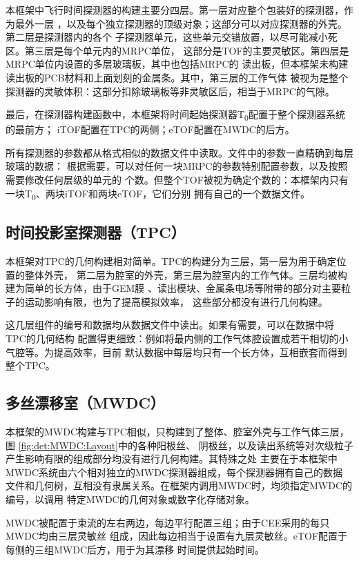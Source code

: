 \documentclass[bachelor,openany,oneside,color]{buaathesis}
\def\TZ{T\textsubscript{0}}
\begin{document}
本框架中飞行时间探测器的构建主要分四层。第一层对应整个包装好的探测器，作为最外一层
，以及每个独立探测器的顶级对象；这部分可以对应探测器的外壳。第二层是探测器内的各个
子探测器单元，这些单元交错放置，以尽可能减小死区。第三层是每个单元内的MRPC单位，
这部分是TOF的主要灵敏区。第四层是MRPC单位内设置的多层玻璃板，其中也包括MRPC的
读出板，但本框架未构建读出板的PCB材料和上面划刻的金属条。其中，第三层的工作气体
被视为是整个探测器的灵敏体积：这部分扣除玻璃板等非灵敏区后，相当于MRPC的气隙。

最后，在探测器构建函数中，本框架将时间起始探测器\TZ 配置于整个探测器系统的最前方；
iTOF配置在TPC的两侧；eTOF配置在MWDC的后方。

所有探测器的参数都从格式相似的数据文件中读取。文件中的参数一直精确到每层玻璃的数据：
根据需要，可以对任何一块MRPC的参数特别配置参数，以及按照需要修改任何层级的单元的
个数。但整个TOF被视为确定个数的：本框架内只有一块\TZ、两块iTOF和两块eTOF，它们分别
拥有自己的一个数据文件。

\subsection{时间投影室探测器（TPC）}

本框架对TPC的几何构建相对简单。TPC的构建分为三层，第一层为用于确定位置的整体外壳，
第二层为腔室的外壳，第三层为腔室内的工作气体。三层均被构建为简单的长方体，由于GEM膜
、读出模块、金属条电场等附带的部分对主要粒子的运动影响有限，也为了提高模拟效率，
这些部分都没有进行几何构建。

这几层组件的编号和数据均从数据文件中读出。如果有需要，可以在数据中将TPC的几何结构
配置得更细致：例如将最内侧的工作气体腔设置成若干相切的小气腔等。为提高效率，目前
默认数据中每层均只有一个长方体，互相嵌套而得到整个TPC。

\subsection{多丝漂移室（MWDC）}

本框架的MWDC构建与TPC相似，只构建到了整体、腔室外壳与工作气体三层，图
\ref{fig:det:MWDC:Layout}中的各种阳极丝、
阴极丝，以及读出系统等对次级粒子产生影响有限的组成部分均没有进行几何构建。其特殊之处
主要在于本框架中MWDC系统由六个相对独立的MWDC探测器组成，每个探测器拥有自己的数据
文件和几何树，互相没有隶属关系。在框架内调用MWDC时，均须指定MWDC的编号，以调用
特定MWDC的几何对象或数字化存储对象。

MWDC被配置于束流的左右两边，每边平行配置三组；由于CEE采用的每只MWDC均由三层灵敏丝
组成，因此每边相当于设置有九层灵敏丝。eTOF配置于每侧的三组MWDC后方，用于为其漂移
时间提供起始时间。
\end{document}
